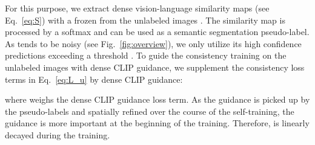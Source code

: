 \documentclass[10pt,twocolumn,letterpaper]{article}
\begin{document}
For this purpose, we extract dense vision-language similarity maps  (see Eq.~\ref{eq:S}) with a frozen  from the unlabeled images . The similarity map is processed by a softmax and can be used as a semantic segmentation  pseudo-label. As  tends to be noisy (see Fig.~\ref{fig:overview}), we only utilize its high confidence predictions exceeding a threshold . To guide the consistency training on the unlabeled images with dense CLIP guidance, we supplement the consistency loss terms  in Eq.~\ref{eq:L_u} by dense CLIP guidance:
    

where  weighs the dense CLIP guidance loss term. As the guidance is picked up by the pseudo-labels  and spatially refined over the course of the self-training, the guidance is more important at the beginning of the training. Therefore,  is linearly decayed during the training.
\end{document}
